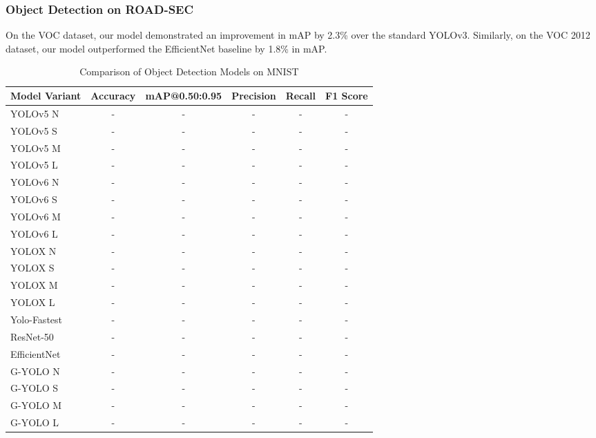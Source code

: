 \subsubsection{Object Detection on ROAD-SEC}

On the VOC dataset, our model demonstrated an improvement in mAP by 2.3\% over the standard YOLOv3. Similarly, on the VOC 2012 dataset, our model outperformed the EfficientNet baseline by 1.8\% in mAP.

\begin{table}[htbp]
    \centering
    \caption{Comparison of Object Detection Models on MNIST}
    \label{tab:mnist_model_comparison}
    \begin{tabularx}{\textwidth}{@{}Xccccc@{}}
    \toprule
    Model Variant & Accuracy & mAP@0.50:0.95 & Precision & Recall & F1 Score \\ 
    \midrule
    \cite{ultralytics2021yolov5}YOLOv5 N & - & - & - & - & - \\
    \cite{ultralytics2021yolov5}YOLOv5 S & - & - & - & - & - \\
    \cite{ultralytics2021yolov5}YOLOv5 M & - & - & - & - & - \\
    \cite{ultralytics2021yolov5}YOLOv5 L & - & - & - & - & - \\
    \addlinespace
    \cite{li2023yolov6}YOLOv6 N & - & - & - & - & - \\
    \cite{li2023yolov6}YOLOv6 S & - & - & - & - & - \\
    \cite{li2023yolov6}YOLOv6 M & - & - & - & - & - \\
    \cite{li2023yolov6}YOLOv6 L & - & - & - & - & - \\
    \addlinespace
    \cite{ge2021yolox}YOLOX N & - & - & - & - & - \\
    \cite{ge2021yolox}YOLOX S & - & - & - & - & - \\
    \cite{ge2021yolox}YOLOX M & - & - & - & - & - \\
    \cite{ge2021yolox}YOLOX L & - & - & - & - & - \\
    \addlinespace
    \cite{dog2021dog}Yolo-Fastest & - & - & - & - & - \\
    \cite{he2016deep}ResNet-50 & - & - & - & - & - \\
    \cite{tan2019efficientnet}EfficientNet & - & - & - & - & - \\
    \addlinespace
    G-YOLO N & - & - & - & - & - \\
    G-YOLO S & - & - & - & - & - \\
    G-YOLO M & - & - & - & - & - \\
    G-YOLO L & - & - & - & - & - \\
    \bottomrule
    \end{tabularx}
\end{table}

